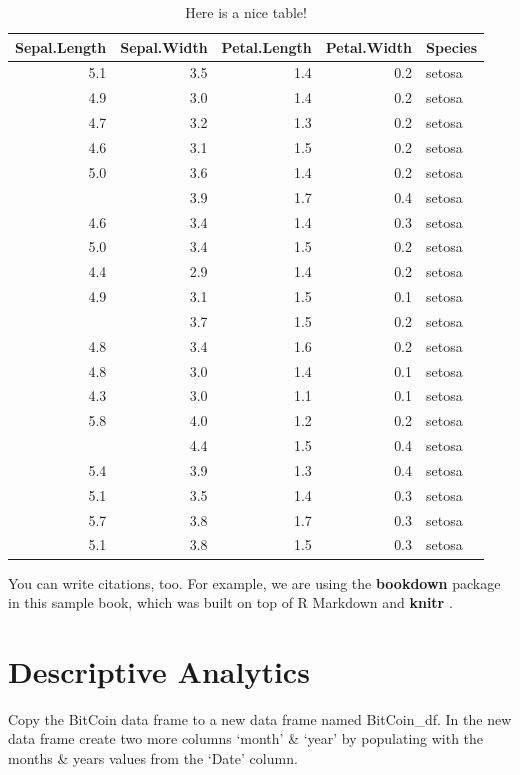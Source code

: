 \documentclass[
]{book}
\begin{document}
\begin{table}

\caption{\label{tab:nice-tab}Here is a nice table!}
\centering
\begin{tabular}[t]{rrrrl}
\toprule
Sepal.Length & Sepal.Width & Petal.Length & Petal.Width & Species\\
\midrule
5.1 & 3.5 & 1.4 & 0.2 & setosa\\
4.9 & 3.0 & 1.4 & 0.2 & setosa\\
4.7 & 3.2 & 1.3 & 0.2 & setosa\\
4.6 & 3.1 & 1.5 & 0.2 & setosa\\
5.0 & 3.6 & 1.4 & 0.2 & setosa\\
\addlinespace
5.4 & 3.9 & 1.7 & 0.4 & setosa\\
4.6 & 3.4 & 1.4 & 0.3 & setosa\\
5.0 & 3.4 & 1.5 & 0.2 & setosa\\
4.4 & 2.9 & 1.4 & 0.2 & setosa\\
4.9 & 3.1 & 1.5 & 0.1 & setosa\\
\addlinespace
5.4 & 3.7 & 1.5 & 0.2 & setosa\\
4.8 & 3.4 & 1.6 & 0.2 & setosa\\
4.8 & 3.0 & 1.4 & 0.1 & setosa\\
4.3 & 3.0 & 1.1 & 0.1 & setosa\\
5.8 & 4.0 & 1.2 & 0.2 & setosa\\
\addlinespace
5.7 & 4.4 & 1.5 & 0.4 & setosa\\
5.4 & 3.9 & 1.3 & 0.4 & setosa\\
5.1 & 3.5 & 1.4 & 0.3 & setosa\\
5.7 & 3.8 & 1.7 & 0.3 & setosa\\
5.1 & 3.8 & 1.5 & 0.3 & setosa\\
\bottomrule
\end{tabular}
\end{table}

You can write citations, too. For example, we are using the \textbf{bookdown} package \citep{R-bookdown} in this sample book, which was built on top of R Markdown and \textbf{knitr} \citep{xie2015}.

\chapter{Descriptive Analytics}\label{descriptive-analytics}

Copy the BitCoin data frame to a new data frame named BitCoin\_df. In the new data frame create two more columns `month' \& `year' by populating with the months \& years values from the `Date' column.
\end{document}

